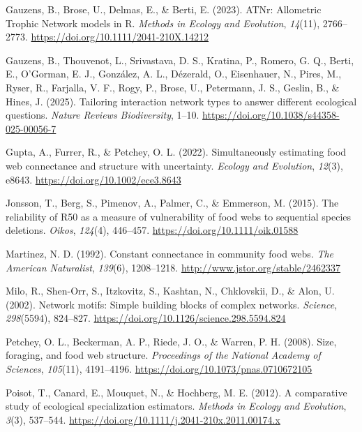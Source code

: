 \documentclass[
]{article}
\newlength{\cslhangindent}
\newenvironment{CSLReferences}[2] %
 {\begin{list}{}{%
  \setlength{\itemindent}{0pt}
  \setlength{\leftmargin}{0pt}
  \setlength{\parsep}{0pt}
  \ifodd #1
   \setlength{\leftmargin}{\cslhangindent}
   \setlength{\itemindent}{-1\cslhangindent}
  \fi
  \setlength{\itemsep}{#2\baselineskip}}}
 {\end{list}}
\begin{document}
\begin{CSLReferences}{1}{0}
Gauzens, B., Brose, U., Delmas, E., \& Berti, E. (2023). ATNr:
Allometric Trophic Network models in R. \emph{Methods in Ecology and
Evolution}, \emph{14}(11), 2766--2773.
\url{https://doi.org/10.1111/2041-210X.14212}

Gauzens, B., Thouvenot, L., Srivastava, D. S., Kratina, P., Romero, G.
Q., Berti, E., O'Gorman, E. J., González, A. L., Dézerald, O.,
Eisenhauer, N., Pires, M., Ryser, R., Farjalla, V. F., Rogy, P., Brose,
U., Petermann, J. S., Geslin, B., \& Hines, J. (2025). Tailoring
interaction network types to answer different ecological questions.
\emph{Nature Reviews Biodiversity}, 1--10.
\url{https://doi.org/10.1038/s44358-025-00056-7}

Gupta, A., Furrer, R., \& Petchey, O. L. (2022). Simultaneously
estimating food web connectance and structure with uncertainty.
\emph{Ecology and Evolution}, \emph{12}(3), e8643.
\url{https://doi.org/10.1002/ece3.8643}

Jonsson, T., Berg, S., Pimenov, A., Palmer, C., \& Emmerson, M. (2015).
The reliability of R50 as a measure of vulnerability of food webs to
sequential species deletions. \emph{Oikos}, \emph{124}(4), 446--457.
\url{https://doi.org/10.1111/oik.01588}

Martinez, N. D. (1992). Constant connectance in community food webs.
\emph{The American Naturalist}, \emph{139}(6), 1208--1218.
\url{http://www.jstor.org/stable/2462337}

Milo, R., Shen-Orr, S., Itzkovitz, S., Kashtan, N., Chklovskii, D., \&
Alon, U. (2002). Network motifs: Simple building blocks of complex
networks. \emph{Science}, \emph{298}(5594), 824--827.
\url{https://doi.org/10.1126/science.298.5594.824}

Petchey, O. L., Beckerman, A. P., Riede, J. O., \& Warren, P. H. (2008).
Size, foraging, and food web structure. \emph{Proceedings of the
National Academy of Sciences}, \emph{105}(11), 4191--4196.
\url{https://doi.org/10.1073/pnas.0710672105}

Poisot, T., Canard, E., Mouquet, N., \& Hochberg, M. E. (2012). A
comparative study of ecological specialization estimators. \emph{Methods
in Ecology and Evolution}, \emph{3}(3), 537--544.
\url{https://doi.org/10.1111/j.2041-210x.2011.00174.x}


\end{CSLReferences}
\end{document}
